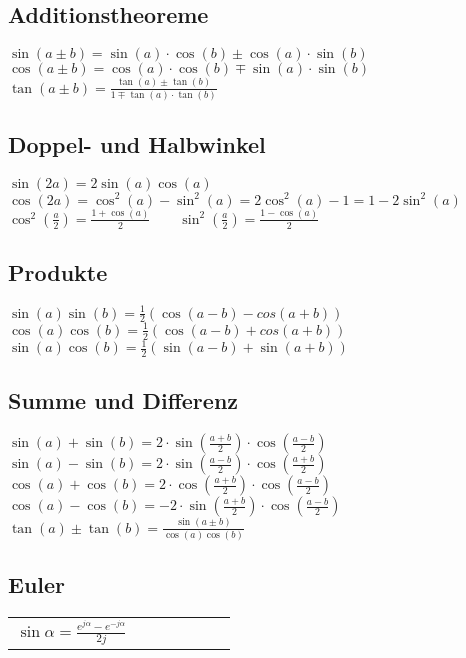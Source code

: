 \begin{minipage}{12.5cm}
  \subsection{Additionstheoreme}
    $\sin(a \pm b)=\sin(a) \cdot \cos(b) \pm \cos(a) \cdot \sin(b)$\\
    $\cos(a \pm b)=\cos(a) \cdot \cos(b) \mp \sin(a) \cdot \sin(b)$\\ 
    $\tan(a \pm b)=\frac{\tan(a) \pm \tan(b)}{1 \mp \tan(a) \cdot \tan(b)}$
    
  \subsection{Doppel- und Halbwinkel} 
    $\sin(2a)=2\sin(a)\cos(a)$\\
    $\cos(2a)=\cos^2(a)-\sin^2(a)=2\cos^2(a)-1=1-2\sin^2(a)$\\
    $\cos^2 \left(\frac{a}{2}\right)=\frac{1+\cos(a)}{2} \qquad
    \sin^2 \left(\frac{a}{2}\right)=\frac{1-\cos(a)}{2}$
    
  \subsection{Produkte}
    $\sin(a)\sin(b)=\frac{1}{2}(\cos(a-b)-cos(a+b))$\\
    $\cos(a)\cos(b)=\frac{1}{2}(\cos(a-b)+cos(a+b))$\\
    $\sin(a)\cos(b)=\frac{1}{2}(\sin(a-b)+\sin(a+b))$
    
  \subsection{Summe und Differenz}
    $\sin(a)+\sin(b)=2 \cdot \sin \left(\frac{a+b}{2}\right) \cdot
    \cos\left(\frac{a-b}{2}\right)$\\
    $\sin(a)-\sin(b)=2 \cdot \sin \left(\frac{a-b}{2}\right) \cdot
    \cos\left(\frac{a+b}{2}\right)$\\
    $\cos(a)+\cos(b)=2 \cdot \cos \left(\frac{a+b}{2}\right) \cdot
    \cos\left(\frac{a-b}{2}\right)$\\
    $\cos(a)-\cos(b)=-2 \cdot \sin \left(\frac{a+b}{2}\right) \cdot
    \cos\left(\frac{a-b}{2}\right)$\\
    $\tan(a) \pm \tan(b)=\frac{\sin(a \pm b)}{\cos(a)\cos(b)}$  
    
  \subsection{Euler}
    \begin{tabular}{lllllll}
      $\sin{\alpha} = \frac{e^{j\alpha} - e^{-j\alpha}}{2j}$ &


\end{tabular}
\end{minipage}
